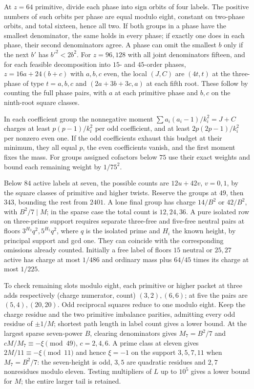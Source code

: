 \documentclass[11pt]{amsart}
\numberwithin{equation}{section}
\theoremstyle{definition}
\theoremstyle{plain}
\begin{document}
At $z=64$ primitive, divide each phase into sign orbits of four labels.
The positive numbers of such orbits per phase are equal modulo eight,
constant on two-phase orbits, and total sixteen, hence all two. If both
groups in a phase have the smallest denominator, the same holds in
every phase; if exactly one does in each phase, their second denominators
agree. A phase can omit the smallest $b$ only if the next $b'$ has
$b'^2<2b^2$. For $z=96,128$ with all joint denominators fifteen, and for each feasible decomposition into $15$- and $45$-order phases,
$z=16a+24(b+c)$ with $a,b,c$ even, the local $(J,C)$ are $(4t,t)$
at the three-phase of type $t=a,b,c$ and $(2a+3b+3c,a)$ at each fifth
root. These follow by counting the full phase pairs, with $a$ at each
primitive phase and $b,c$ on the ninth-root square classes.

In each coefficient group the nonnegative moment
$\sum a_i(a_i-1)/k_i^2=J+C$ charges at least $p(p-1)/k_i^2$ per
odd coefficient, and at least $2p(2p-1)/k_i^2$ per nonzero even one.
If the odd coefficients exhaust this budget at their minimum, they
all equal $p$, the even coefficients vanish, and the first moment fixes
the mass. For groups assigned cofactors below $75$ use their exact
weights and bound each remaining weight by $1/75^2$.

Below $84$ active labels at seven, the possible counts are
$12u+42v$, $v=0,1$, by the square classes of primitive and higher twists.
Reserve the groups at $49$, then $343$, bounding the rest from $2401$.
A lone final group has charge $14/B^2$ or $42/B^2$, with $B^2/7\mid M$;
in the sparse case the total count is $12,24,36$. A pure isolated row
on three-prime support requires separate three-free and five-free neutral
pairs at floors $3^{H_3}q^2,5^{H_5}q^2$, where $q$ is the isolated
prime and $H_i$ the known height, by principal support and gcd one.
They can coincide with the corresponding omissions already counted.
Initially a free label of floors $15$ neutral or $25,27$ active has
charge at most $1/486$ and ordinary mass plus $64/45$ times its charge
at most $1/225$.

To check remaining slots modulo eight, each primitive or higher packet
at three adds respectively (charge numerator, count) $(3,2),(6,6)$;
at five the pairs are $(5,4),(20,20)$. Odd reciprocal squares reduce
to one modulo eight. Keep the charge residue and the two primitive
imbalance parities, admitting every odd residue of $\pm1/M$; shortest
path length in label count gives a lower bound. At the largest sparse
seven-power $B$, clearing denominators gives $M_7=B^2/7$ and
$cM/M_7\equiv-\xi\pmod{49}$, $c=2,4,6$. A prime class at eleven gives
$2M/11\equiv-\xi\pmod{11}$ and hence $\xi=-1$ on the support
$3,5,7,11$ when $M_7=B^2/7$: the seven-height is odd, $3,5$ are
quadratic residues and $2,7$ nonresidues modulo eleven. Testing
multipliers of $L$ up to $10^5$ gives a lower bound for $M$; the
entire larger tail is retained.
\end{document}
